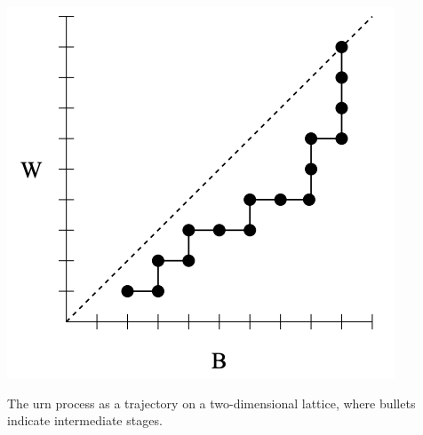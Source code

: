 \documentclass{tufte-handout}
\begin{document}
  \begin{marginfigure}
  \begin{center}
  \includegraphics[width=\textwidth]{fig-11.png}
  \caption{The urn process as a trajectory on a two-dimensional lattice, where bullets indicate intermediate stages.}
  \end{center}
  \end{marginfigure}
\end{document}
